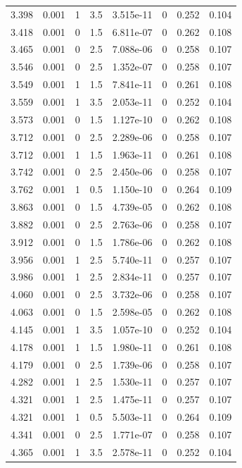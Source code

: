 \documentclass[preview]{standalone}
\begin{document}
{{{\begin{tabular}{L{1.2cm}C{1.2cm} C{0.3cm}C{0.5cm} C{1.4cm}C{1.4cm} C{1.4cm}C{1.4cm}}
  3.398  &  0.001  & 1     & 3.5 &  3.515e-11  & 0  & 0.252 &  0.104   \\ 
  3.418  &  0.001  & 0     & 1.5 &  6.811e-07  & 0  & 0.262 &  0.108   \\ 
  3.465  &  0.001  & 0     & 2.5 &  7.088e-06  & 0  & 0.258 &  0.107   \\ 
  3.546  &  0.001  & 0     & 2.5 &  1.352e-07  & 0  & 0.258 &  0.107   \\ 
  3.549  &  0.001  & 1     & 1.5 &  7.841e-11  & 0  & 0.261 &  0.108   \\ 
  3.559  &  0.001  & 1     & 3.5 &  2.053e-11  & 0  & 0.252 &  0.104   \\ 
  3.573  &  0.001  & 0     & 1.5 &  1.127e-10  & 0  & 0.262 &  0.108   \\ 
  3.712  &  0.001  & 0     & 2.5 &  2.289e-06  & 0  & 0.258 &  0.107   \\ 
  3.712  &  0.001  & 1     & 1.5 &  1.963e-11  & 0  & 0.261 &  0.108   \\ 
  3.742  &  0.001  & 0     & 2.5 &  2.450e-06  & 0  & 0.258 &  0.107   \\ 
  3.762  &  0.001  & 1     & 0.5 &  1.150e-10  & 0  & 0.264 &  0.109   \\ 
  3.863  &  0.001  & 0     & 1.5 &  4.739e-05  & 0  & 0.262 &  0.108   \\ 
  3.882  &  0.001  & 0     & 2.5 &  2.763e-06  & 0  & 0.258 &  0.107   \\ 
  3.912  &  0.001  & 0     & 1.5 &  1.786e-06  & 0  & 0.262 &  0.108   \\ 
  3.956  &  0.001  & 1     & 2.5 &  5.740e-11  & 0  & 0.257 &  0.107   \\ 
  3.986  &  0.001  & 1     & 2.5 &  2.834e-11  & 0  & 0.257 &  0.107   \\ 
  4.060  &  0.001  & 0     & 2.5 &  3.732e-06  & 0  & 0.258 &  0.107   \\ 
  4.063  &  0.001  & 0     & 1.5 &  2.598e-05  & 0  & 0.262 &  0.108   \\ 
  4.145  &  0.001  & 1     & 3.5 &  1.057e-10  & 0  & 0.252 &  0.104   \\ 
  4.178  &  0.001  & 1     & 1.5 &  1.980e-11  & 0  & 0.261 &  0.108   \\ 
  4.179  &  0.001  & 0     & 2.5 &  1.739e-06  & 0  & 0.258 &  0.107   \\ 
  4.282  &  0.001  & 1     & 2.5 &  1.530e-11  & 0  & 0.257 &  0.107   \\ 
  4.321  &  0.001  & 1     & 2.5 &  1.475e-11  & 0  & 0.257 &  0.107   \\ 
  4.321  &  0.001  & 1     & 0.5 &  5.503e-11  & 0  & 0.264 &  0.109   \\ 
  4.341  &  0.001  & 0     & 2.5 &  1.771e-07  & 0  & 0.258 &  0.107   \\ 
  4.365  &  0.001  & 1     & 3.5 &  2.578e-11  & 0  & 0.252 &  0.104   \\ 
\hline 
\end{tabular} 

}}}
\end{document}
